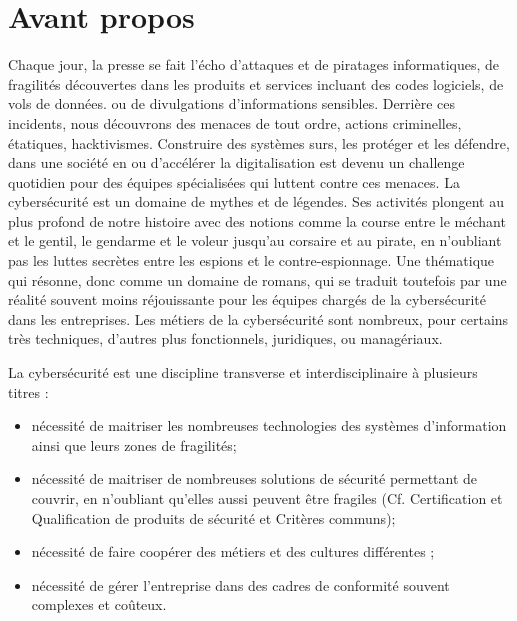 
\section{Avant propos }

Chaque jour, la presse se fait l'écho d'attaques et de piratages informatiques, de fragilités découvertes dans les produits et services incluant des codes logiciels, de vols de données. ou de divulgations d'informations sensibles.
Derrière ces incidents, nous découvrons des menaces de tout ordre, actions criminelles, étatiques, hacktivismes. Construire des systèmes surs, les protéger et les défendre, dans une société en ou d'accélérer la digitalisation est devenu un challenge quotidien pour des équipes spécialisées qui luttent contre ces menaces. 
La cybersécurité est un domaine de mythes et de légendes. Ses activités plongent au plus profond de notre histoire avec des notions comme la course entre le méchant et le gentil, le gendarme et le voleur jusqu'au corsaire et au pirate, en n'oubliant pas les luttes secrètes entre les espions et le contre-espionnage. Une thématique qui résonne, donc comme un domaine de romans, qui se traduit toutefois par une réalité souvent moins réjouissante pour les équipes chargés de la cybersécurité dans les entreprises. Les métiers de la cybersécurité sont nombreux, pour certains très techniques, d'autres plus fonctionnels, juridiques, ou managériaux. 

La cybersécurité est une discipline transverse et interdisciplinaire à plusieurs titres :
\begin{itemize}
  \item nécessité de maitriser les nombreuses technologies des systèmes d'information ainsi que leurs zones de fragilités;
  \item nécessité de maitriser de nombreuses solutions de sécurité permettant de couvrir, en n'oubliant qu'elles aussi peuvent être fragiles (Cf. Certification et Qualification de produits de sécurité et Critères communs);
  \item nécessité de faire coopérer des métiers et des cultures différentes ;
  \item nécessité de gérer l'entreprise dans des cadres de conformité souvent complexes et coûteux.
\end{itemize}


